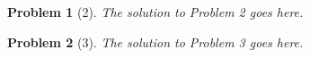 \documentclass[11pt]{article}
\theoremstyle{quest}
\newtheorem*{question}{Problem}
\begin{document}
\begin{question}[2]  
\hfill \break

The solution to Problem 2 goes here.



\end{question}
\newpage



\begin{question}[3]
\hfill \break

The solution to Problem 3 goes here.


\end{question}
\newpage




\newpage




\end{document}
